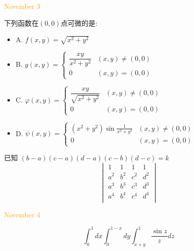 \begin{solution}
	
\end{solution}


\textcolor{orange}{November 3}

\begin{example}[][Exam: 37.1.5]
	下列函数在$(0,0)$点可微的是:
\begin{itemize}
	\item A. $f(x,y)=\sqrt{x^2+y^2}$
	\item B. $g(x,y)=
	\begin{cases}
		\dfrac{xy}{x^2+y^2} & (x,y)\neq (0,0)\\
		0 & (x,y)=(0,0)
	\end{cases}$
	\item C. $\varphi(x,y)=
	\begin{cases}
		\dfrac{xy}{\sqrt{x^2+y^2}} & (x,y)\neq (0,0)\\
		0 & (x,y)=(0,0)
	\end{cases}$
	\item D. $\psi(x,y)=
	\begin{cases}
		(x^2+y^2)\sin\frac{1}{x^2+y^2} & (x,y)\neq (0,0)\\
		0 & (x,y)=(0,0)
	\end{cases}$
\end{itemize}
\end{example}

\begin{solution}
	
\end{solution}

\begin{example}[][Exam: 37.1.6]
	已知 $(b-a)(c-a)(d-a)(c-b)(d-c)=k$
$$\begin{vmatrix}
	  1   &   1   &  1    &  1    \\
	a^{2} & b^{2} & c^{2} & d^{2} \\
	a^{3} & b^{3} & c^{3} & d^{3} \\
	a^{4} & b^{4} & c^{4} & d^{4} \\
\end{vmatrix}$$
\end{example}

\begin{solution}
	
\end{solution}


\textcolor{orange}{November 4}

\begin{example}[][Exam: 37.1.7]
	$$\int_{0}^{1}dx\int_{0}^{1-x}dy\int_{x+y}^{1}\dfrac{\sin z}{z}dz$$
\end{example}

